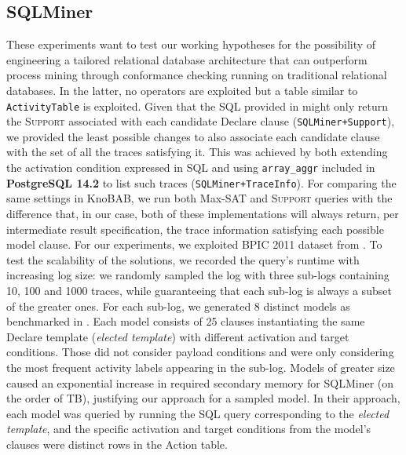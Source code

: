 \subsection{SQLMiner}\label{ssec:sqlmin}
These experiments want to test our working hypotheses for the possibility of engineering a tailored relational database architecture that can outperform process mining through conformance checking running on traditional relational databases. In the latter, no \LTLf operators are exploited but a table similar to \texttt{ActivityTable} is exploited. %
Given that the SQL provided in \cite{Schonig15,SchonigRCJM16} might only return the \textsc{Support} associated with each candidate Declare clause (\texttt{SQLMiner+Support}), we provided the least possible changes to also associate each candidate clause with the set of all the traces satisfying it. This was achieved by both extending the activation condition expressed in SQL and using \texttt{array\_aggr} included in \textbf{PostgreSQL 14.2} to list such traces (\texttt{SQLMiner+TraceInfo}). For comparing the same settings in KnoBAB, we run both Max-SAT and \textsc{Support} queries with the difference that, in our case, both of these implementations will always return, per intermediate result specification, the trace information satisfying each possible model clause.
For our experiments, we exploited {BPIC 2011} dataset from \cite{SchonigRCJM16}. To test the scalability of the solutions, we recorded the query's runtime with increasing log size: we randomly sampled the log with three sub-logs containing 10, 100 and 1000 traces, while guaranteeing that each sub-log is always a subset of the greater ones. For each sub-log, we generated 8 distinct models as benchmarked in \cite{Schonig15}. Each model consists of 25 clauses instantiating the same Declare template (\textit{elected template}) with different activation and target conditions. Those did not consider payload conditions and were only considering the most frequent activity labels appearing in the sub-log. Models of greater size  caused an exponential increase in required secondary memory for SQLMiner (on the order of TB), justifying our approach for a sampled model. In their approach, each model was queried by running the SQL query corresponding to the \textit{elected template}, and the specific activation and target conditions from the model's clauses were distinct rows in the \textsf{Action} table.


